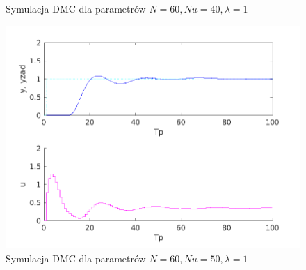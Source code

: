 \documentclass[a4paper, 10pt]{article}
\begin{document}
\begin{figure}
\caption{Symulacja DMC dla parametrów $N=60, Nu = 40, \lambda = 1$}
\label{fig:z5_60_60_40_1}
\end{figure}\begin{figure}
\centering
\includegraphics[width=0.7\linewidth]{z5_60_60_50_1.png}
\caption{Symulacja DMC dla parametrów $N=60, Nu = 50, \lambda = 1$}
\label{fig:z5_60_60_50_1}
\end{figure}
\end{document}
